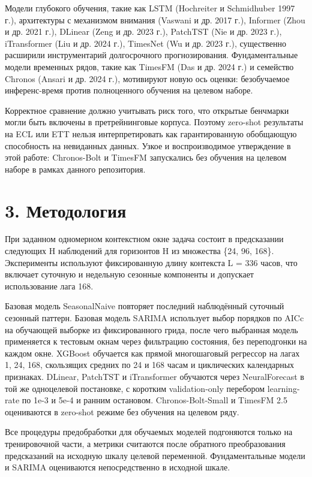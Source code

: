 Модели глубокого обучения, такие как LSTM (Hochreiter и Schmidhuber 1997
г.), архитектуры с механизмом внимания (Vaswani и др. 2017 г.), Informer
(Zhou и др. 2021 г.), DLinear (Zeng и др. 2023 г.), PatchTST (Nie и др.
2023 г.), iTransformer (Liu и др. 2024 г.), TimesNet (Wu и др. 2023 г.),
существенно расширили инструментарий долгосрочного прогнозирования.
Фундаментальные модели временных рядов, такие как TimesFM (Das и др.
2024 г.) и семейство Chronos (Ansari и др. 2024 г.), мотивируют новую
ось оценки: безобучаемое инференс-время против полноценного обучения на
целевом наборе.

Корректное сравнение должно учитывать риск того, что открытые бенчмарки
могли быть включены в претрейнинговые корпуса. Поэтому zero-shot
результаты на ECL или ETT нельзя интерпретировать как гарантированную
обобщающую способность на невиданных данных. Узкое и воспроизводимое
утверждение в этой работе: Chronos-Bolt и TimesFM запускались без
обучения на целевом наборе в рамках данного репозитория.

\section{3.
Методология}\label{ux43cux435ux442ux43eux434ux43eux43bux43eux433ux438ux44f}

При заданном одномерном контекстном окне задача состоит в предсказании
следующих H наблюдений для горизонтов H из множества \{24, 96, 168\}.
Эксперименты используют фиксированную длину контекста L = 336 часов, что
включает суточную и недельную сезонные компоненты и допускает
использование лага 168.

Базовая модель SeasonalNaive повторяет последний наблюдённый суточный
сезонный паттерн. Базовая модель SARIMA использует выбор порядков по
AICc на обучающей выборке из фиксированного грида, после чего выбранная
модель применяется к тестовым окнам через фильтрацию состояния, без
переподгонки на каждом окне. XGBoost обучается как прямой многошаговый
регрессор на лагах 1, 24, 168, скользящих средних по 24 и 168 часам и
циклических календарных признаках. DLinear, PatchTST и iTransformer
обучаются через NeuralForecast в той же одноцелевой постановке, с
коротким validation-only перебором learning-rate по 1e-3 и 5e-4 и ранним
остановом. Chronos-Bolt-Small и TimesFM 2.5 оцениваются в zero-shot
режиме без обучения на целевом ряду.

Все процедуры предобработки для обучаемых моделей подгоняются только на
тренировочной части, а метрики считаются после обратного преобразования
предсказаний на исходную шкалу целевой переменной. Фундаментальные
модели и SARIMA оцениваются непосредственно в исходной шкале.

